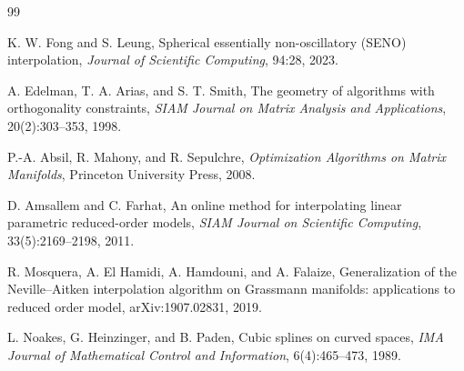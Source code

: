 \documentclass[a4paper,11pt]{article}
\numberwithin{equation}{section}
\theoremstyle{plain}
\theoremstyle{definition}
\theoremstyle{remark}
\begin{document}
\begin{thebibliography}{99}

K. W. Fong and S. Leung,
\newblock Spherical essentially non-oscillatory (SENO) interpolation,
\newblock \emph{Journal of Scientific Computing}, 94:28, 2023.

A. Edelman, T. A. Arias, and S. T. Smith,
\newblock The geometry of algorithms with orthogonality constraints,
\newblock \emph{SIAM Journal on Matrix Analysis and Applications}, 20(2):303--353, 1998.

P.-A. Absil, R. Mahony, and R. Sepulchre,
\newblock \emph{Optimization Algorithms on Matrix Manifolds},
\newblock Princeton University Press, 2008.


D. Amsallem and C. Farhat,
\newblock An online method for interpolating linear parametric reduced-order models,
\newblock \emph{SIAM Journal on Scientific Computing}, 33(5):2169--2198, 2011.

R. Mosquera, A. El Hamidi, A. Hamdouni, and A. Falaize,
\newblock Generalization of the Neville--Aitken interpolation algorithm on Grassmann manifolds: applications to reduced order model,
\newblock arXiv:1907.02831, 2019.

L. Noakes, G. Heinzinger, and B. Paden,
\newblock Cubic splines on curved spaces,
\newblock \emph{IMA Journal of Mathematical Control and Information}, 6(4):465--473, 1989.

\end{thebibliography}
\end{document}
